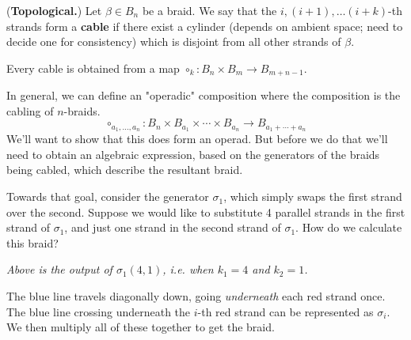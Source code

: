 \begin{definition}
    (\textbf{Topological.})
    Let $\beta \in B_n$ be a braid. We say that the $i, (i+1), \dots (i + k)$-th strands
    form a \textbf{cable} if there exist a cylinder (depends on ambient space; need to decide 
    one for consistency)
    which is disjoint from all other strands of $\beta$.
\end{definition}

\begin{proposition}
    Every cable is obtained from a map $\circ_k: B_n \times B_m \to B_{m + n -1}$. 
\end{proposition}

In general, we can define an "operadic" composition where the composition is the cabling of $n$-braids.
\[
    \circ_{a_1, \dots, a_n}: B_n \times B_{a_1} \times \cdots \times B_{a_n} \to B_{a_1 + \cdots + a_n}
\]
We'll want to show that this does form an operad. But before we do that we'll need to 
obtain an algebraic expression, based on the generators of the braids being cabled,
which describe the resultant braid. 

Towards that goal,
consider the generator $\sigma_1$, which simply swaps the first strand over 
the second. Suppose we would like to substitute 4 parallel strands in the first strand 
of $\sigma_1$, and just one strand in the second strand of $\sigma_1$. 
How do we calculate this braid?

\begin{center}
    \hspace{1cm}
    \raisebox{2cm}{$\mapsto$}
    \hspace{1cm}

    \emph{Above is the output of $\sigma_1(4, 1)$, i.e. when $k_1 = 4$ and $k_2 = 1$.}
\end{center}

The blue line travels diagonally down, going \emph{underneath} each red strand once.
The blue line crossing underneath the $i$-th red strand can be represented as 
$\sigma_{i}$. We then multiply all of these together to get the braid.

